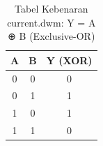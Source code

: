 \begin{table}[h]
\centering
\begin{tabular}{| c | c || c |}
\hline
\textbf{A} & \textbf{B} & \textbf{Y (XOR)} \\ \hline
0 & 0 & 0 \\
0 & 1 & 1 \\
1 & 0 & 1 \\
1 & 1 & 0 \\
\hline
\end{tabular}
\caption{Tabel Kebenaran current.dwm: Y = A ⊕ B  (Exclusive-OR)}
\end{table}
